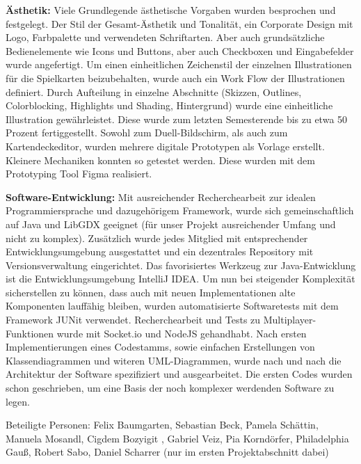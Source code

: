 \textbf{Ästhetik:}
Viele Grundlegende ästhetische Vorgaben wurden besprochen und festgelegt. Der Stil der Gesamt-Ästhetik und Tonalität, ein Corporate Design mit Logo, Farbpalette und verwendeten Schriftarten.
Aber auch grundsätzliche Bedienelemente wie Icons und Buttons, aber auch Checkboxen und Eingabefelder wurde angefertigt. Um einen einheitlichen Zeichenstil der einzelnen Illustrationen für die Spielkarten beizubehalten, wurde auch ein Work Flow der Illustrationen definiert. Durch Aufteilung in einzelne Abschnitte (Skizzen, Outlines, Colorblocking, Highlights und Shading, Hintergrund) wurde eine einheitliche Illustration gewährleistet. Diese wurde zum letzten Semesterende bis zu etwa 50 Prozent fertiggestellt. Sowohl zum Duell-Bildschirm, als auch zum Kartendeckeditor, wurden mehrere digitale Prototypen als Vorlage erstellt. Kleinere Mechaniken konnten so getestet werden. Diese wurden mit dem Prototyping Tool Figma realisiert.

\textbf{Software-Entwicklung:}
Mit ausreichender Recherchearbeit zur idealen Programmiersprache und dazugehörigem Framework, wurde sich gemeinschaftlich auf Java und LibGDX geeignet (für unser Projekt ausreichender Umfang und nicht zu komplex). Zusätzlich wurde jedes Mitglied mit entsprechender Entwicklungsumgebung ausgestattet und ein dezentrales Repository mit Versionsverwaltung eingerichtet. Das favorisiertes Werkzeug zur Java-Entwicklung ist die Entwicklungsumgebung IntelliJ IDEA.
Um nun bei steigender Komplexität sicherstellen zu können, dass auch mit neuen Implementationen alte Komponenten lauffähig bleiben, wurden automatisierte Softwaretests mit dem Framework JUNit verwendet. Recherchearbeit und Tests zu Multiplayer-Funktionen wurde mit Socket.io und NodeJS gehandhabt. Nach ersten Implementierungen eines Codestamms, sowie einfachen Erstellungen von Klassendiagrammen und witeren UML-Diagrammen, wurde nach und nach die Architektur der Software spezifiziert und ausgearbeitet. Die ersten Codes wurden schon geschrieben, um eine Basis der noch komplexer werdenden Software zu legen.

Beteiligte Personen: Felix Baumgarten, Sebastian Beck, Pamela Schättin, Manuela Mosandl, Cigdem Bozyigit , Gabriel Veiz, Pia Korndörfer, Philadelphia Gauß, Robert Sabo, Daniel Scharrer (nur im ersten Projektabschnitt dabei)